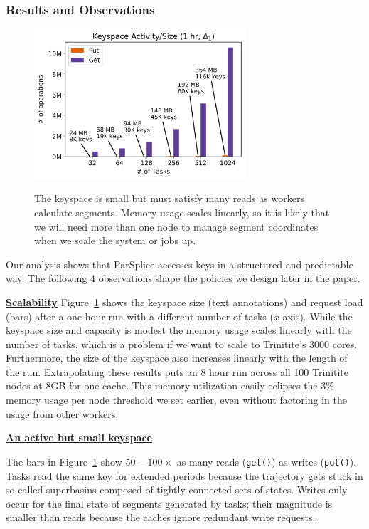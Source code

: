 \subsubsection{Results and Observations}
\label{sec:parsplice-keyspace-analysis}

\begin{figure}[t]
  \centering
  \includegraphics[width=0.7\textwidth]{./chapters/controlplane/parsplice/figures/methodology-keyspace.png}\\
  \caption{The keyspace is small but must satisfy many reads as workers
  calculate segments. Memory usage scales linearly, so it is likely that we will need
  more than one node to manage segment coordinates when we scale the system or jobs up.
  \label{fig:methodology-keyspace}}
\end{figure}

Our analysis shows that ParSplice accesses keys in a structured and predictable
way. The following 4 observations shape the policies we design later in the
paper.

\textbf{\underline{Scalability}} Figure~\ref{fig:methodology-keyspace} shows the
keyspace size (text annotations) and request load (bars) after a one hour run
with a different number of tasks (\(x\) axis). While the keyspace size and
capacity is modest the memory usage scales linearly with the number
of tasks, which is a problem if we want to scale to Trinitite's 3000 cores.
Furthermore, the size of the keyspace also increases linearly with the length
of the run.  Extrapolating these results puts an 8 hour run across all 100
Trinitite nodes at 8GB for one cache.  This memory utilization easily eclipses
the 3\% memory usage per node threshold we set earlier, even without factoring
in the usage from other workers.

\textbf{\underline{An active but small keyspace}}

The bars in Figure~\ref{fig:methodology-keyspace} show \(50-100\times\) as many
reads (\texttt{get()}) as writes (\texttt{put()}).  Tasks read the same key for
extended periods because the trajectory gets stuck in so-called superbasins
composed of tightly connected sets of states.  Writes only occur for the final
state of segments generated by tasks; their magnitude is smaller than reads
because the caches ignore redundant write requests. 

